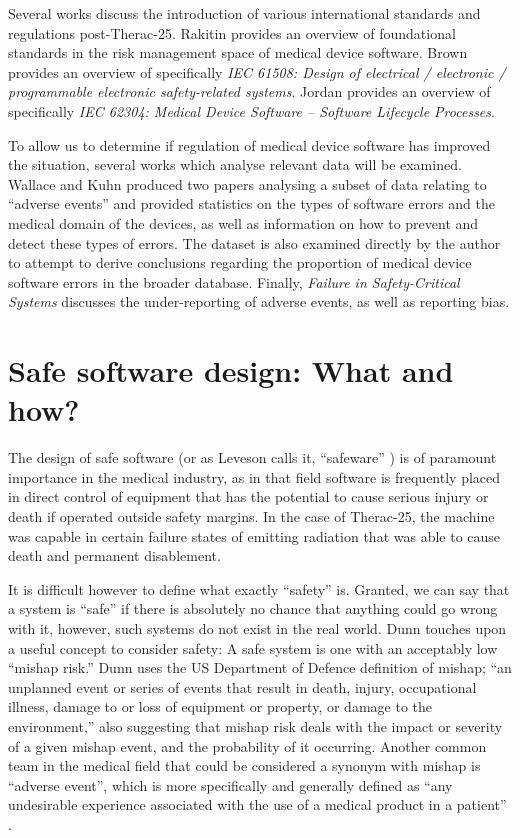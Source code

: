 \documentclass{cshonours}
\newcommand{\ther}{Therac-25\xspace}
\begin{document}
Several works discuss the introduction of various international standards and regulations post-\ther. Rakitin \cite{rakitin2006coping} provides an overview of foundational standards in the risk management space of medical device software. Brown \cite{iec61508} provides an overview of specifically \textit{IEC 61508: Design of electrical / electronic / programmable electronic safety-related systems}. Jordan \cite{jordan2006standard} provides an overview of specifically \textit{IEC 62304: Medical Device Software -- Software Lifecycle Processes}.

To allow us to determine if regulation of medical device software has improved the situation, several works which analyse relevant data will be examined. Wallace and Kuhn produced two papers \cite{wallace1999lessons,wallace2001failure} analysing a subset of \fda data relating to ``adverse events'' and provided statistics on the types of software errors and the medical domain of the devices, as well as information on how to prevent and detect these types of errors. The \fda \maude dataset \cite{maude} is also examined directly by the author to attempt to derive conclusions regarding the proportion of medical device software errors in the broader \maude database. Finally, \textit{Failure in Safety-Critical Systems} \cite[ch.~5]{johnson2003failure} discusses the under-reporting of adverse events, as well as reporting bias.


\chapter{Safe software design: What and how?}
\label{chap:safesoftware}
The design of safe software (or as Leveson calls it, ``safeware'' \cite{safeware}) is of paramount importance in the medical industry, as in that field software is frequently placed in direct control of equipment that has the potential to cause serious injury or death if operated outside safety margins. In the case of \ther, the machine was capable in certain failure states of emitting radiation that was able to cause death and permanent disablement.

It is difficult however to define what exactly ``safety'' is. Granted, we can say that a system is ``safe'' if there is absolutely no chance that anything could go wrong with it, however, such systems do not exist in the real world. Dunn \cite{dunn2003designing} touches upon a useful concept to consider safety: A safe system is one with an acceptably low ``mishap risk.'' Dunn uses the US Department of Defence definition of mishap; ``an unplanned event or series of events that result in death, injury, occupational illness, damage to or loss of equipment or property, or damage to the environment,'' also suggesting that mishap risk deals with the impact or severity of a given mishap event, and the probability of it occurring. Another common team in the medical field that could be considered a synonym with mishap is ``adverse event'', which is more specifically and generally defined as ``any undesirable experience associated with the use of a medical product in a patient'' \cite{fdaadverse}.
\end{document}
